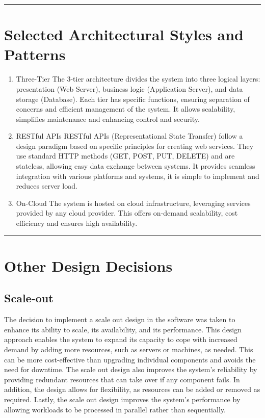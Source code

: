 \documentclass{Configuration_Files/Template}
\begin{document}
{\color{bluepoli}\rule{\linewidth}{0.1pt}}

\section{Selected Architectural Styles and Patterns}

\begin{enumerate}
    \item \textcolor{bluepoli}{Three-Tier} The 3-tier architecture divides the system into three logical layers: presentation (Web Server), business logic (Application Server), and data storage (Database). Each tier has specific functions, ensuring separation of concerns and efficient management of the system. It allows scalability, simplifies maintenance and enhancing control and security. 
    \item \textcolor{bluepoli}{RESTful APIs} RESTful APIs (Representational State Transfer) follow a design paradigm based on specific principles for creating web services. They use standard HTTP methods (GET, POST, PUT, DELETE) and are stateless, allowing easy data exchange between systems. It provides seamless integration with various platforms and systems, it is simple to implement and reduces server load.
    \item \textcolor{bluepoli}{On-Cloud} The system is hosted on cloud infrastructure, leveraging services provided by any cloud provider. This offers on-demand scalability, cost efficiency and ensures high availability.
\end{enumerate}

{\color{bluepoli}\rule{\linewidth}{0.1pt}}

\section{Other Design Decisions}

\subsection{Scale-out} 

The decision to implement a scale out design in the software was taken to enhance its ability to scale, its availability, and its performance. This design approach enables the system to expand its capacity to cope with increased demand by adding more resources, such as servers or machines, as needed. This can be more cost-effective than upgrading individual components and avoids the need for downtime. The scale out design also improves the system’s reliability by providing redundant resources that can take over if
any component fails. In addition, the design allows for flexibility, as resources can be added or removed as required. Lastly, the scale out design improves the system’s performance by allowing workloads to be processed in parallel rather than sequentially.
\end{document}
